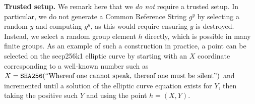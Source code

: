 \noindent
\textbf{Trusted setup.}
We remark here that we \emph{do not} require a trusted setup. In particular, we do not generate a Common Reference String $g^y$ by selecting a random $y$ and computing $g^y$, as this would require ensuring $y$ is destroyed. Instead, we select a random group element $h$ directly, which is possible in many finite groups. As an example of such a construction in practice, a point can be selected on the secp256k1 elliptic curve by starting with an $X$ coordinate corresponding to a well-known number such as $X = \texttt{SHA256}(\text{``Whereof one cannot speak, thereof one must be silent''})$ and incremented until a solution of the elliptic curve equation exists for $Y$, then taking the positive such $Y$ and using the point $h = (X, Y)$.
